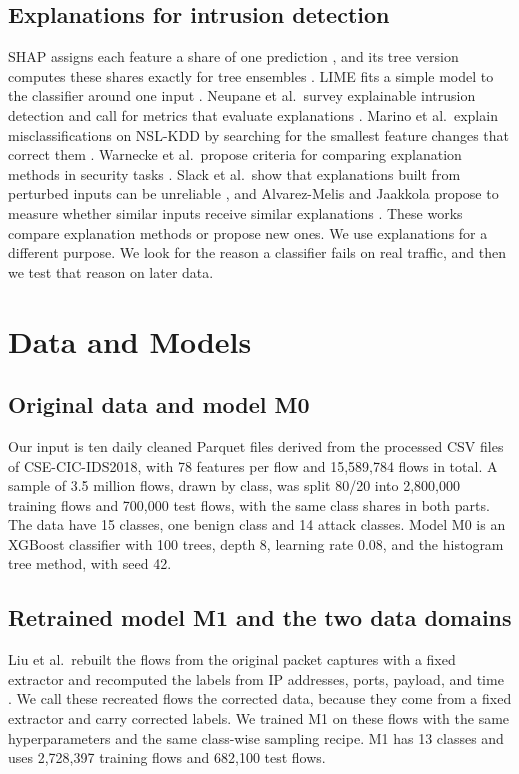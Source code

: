 \documentclass[conference]{IEEEtran}
\begin{document}
\subsection{Explanations for intrusion detection}
SHAP assigns each feature a share of one prediction \cite{lundberg2017}, and its tree version computes these shares exactly for tree ensembles \cite{lundberg2020}. LIME fits a simple model to the classifier around one input \cite{ribeiro2016}. Neupane et al.\ survey explainable intrusion detection and call for metrics that evaluate explanations \cite{neupane2022}. Marino et al.\ explain misclassifications on NSL-KDD by searching for the smallest feature changes that correct them \cite{marino2018}. Warnecke et al.\ propose criteria for comparing explanation methods in security tasks \cite{warnecke2020}. Slack et al.\ show that explanations built from perturbed inputs can be unreliable \cite{slack2019}, and Alvarez-Melis and Jaakkola propose to measure whether similar inputs receive similar explanations \cite{alvarezmelis2018}. These works compare explanation methods or propose new ones. We use explanations for a different purpose. We look for the reason a classifier fails on real traffic, and then we test that reason on later data.

\section{Data and Models}
\subsection{Original data and model M0}
Our input is ten daily cleaned Parquet files derived from the processed CSV files of CSE-CIC-IDS2018, with 78 features per flow and 15,589,784 flows in total. A sample of 3.5 million flows, drawn by class, was split 80/20 into 2,800,000 training flows and 700,000 test flows, with the same class shares in both parts. The data have 15 classes, one benign class and 14 attack classes. Model M0 is an XGBoost classifier with 100 trees, depth 8, learning rate 0.08, and the histogram tree method, with seed 42.

\subsection{Retrained model M1 and the two data domains}
Liu et al.\ rebuilt the flows from the original packet captures with a fixed extractor and recomputed the labels from IP addresses, ports, payload, and time \cite{liu2022}. We call these recreated flows the corrected data, because they come from a fixed extractor and carry corrected labels. We trained M1 on these flows with the same hyperparameters and the same class-wise sampling recipe. M1 has 13 classes and uses 2,728,397 training flows and 682,100 test flows.
\end{document}
